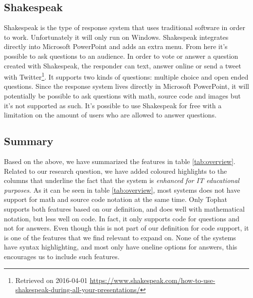 \subsection*{Shakespeak}
Shakespeak is the type of response system that uses traditional software in order to work. Unfortunately it will only run on Windows. Shakespeak integrates directly into Microsoft PowerPoint and adds an extra menu. From here it's possible to ask questions to an audience. In order to vote or answer a question created with Shakespeak, the responder can text, answer online or send a tweet with Twitter\footnote{Retrieved on 2016-04-01 \url{https://www.shakespeak.com/how-to-use-shakespeak-during-all-your-presentations/}}. It supports two kinds of questions: multiple choice and open ended questions. Since the response system lives directly in Microsoft PowerPoint, it will potentially be possible to ask questions with math, source code and images but it's not supported as such. It's possible to use Shakespeak for free with a limitation on the amount of users who are allowed to answer questions.



\subsection{Summary}
Based on the above, we have summarized the features in table \ref{tab:overview}. Related to our research question, we have added coloured highlights to the columns that underline the fact that the system is \emph{enhanced for IT educational purposes}. As it can be seen in table \ref{tab:overview}, most systems does not have support for math and source code notation at the same time. Only Tophat supports both features based on our definition, and does well with mathematical notation, but less well on code. In fact, it only supports code for questions and not for answers. Even though this is not part of our definition for code support, it is one of the features that we find relevant to expand on.
None of the systems have syntax highlighting, and most only have oneline options for answers, this encourages us to include such features.



